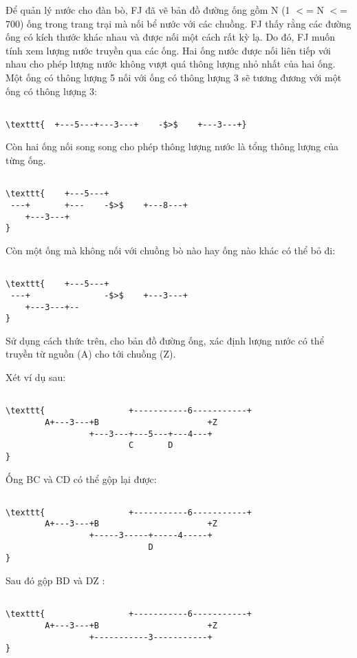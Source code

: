 

Để quản lý nước cho đàn bò, FJ đã vẽ bản đồ đường ống gồm N (1 $<$= N $<$= 700) ống trong trang trại mà nối bể nước với các chuồng. FJ thấy rằng các đường ống có kích thước khác nhau và được nối một cách rất kỳ lạ. Do đó, FJ muốn tính xem lượng nước truyền qua các ống. Hai ống nước được nối liên tiếp với nhau cho phép lượng nước không vượt quá thông lượng nhỏ nhất của hai ống. Một ống có thông lượng 5 nối với ống có thông lượng 3 sẽ tương đương với một ống có thông lượng 3:
\begin{verbatim}

\texttt{  +---5---+---3---+    -$>$    +---3---+}\end{verbatim}

Còn hai ống nối song song cho phép thông lượng nước là tổng thông lượng của từng ống.
\begin{verbatim}

\texttt{    +---5---+
 ---+       +---    -$>$    +---8---+
    +---3---+
}\end{verbatim}

Còn một ống mà không nối với chuồng bò nào hay ống nào khác có thể bỏ đi:
\begin{verbatim}

\texttt{    +---5---+
 ---+               -$>$    +---3---+
    +---3---+--
}\end{verbatim}

Sử dụng cách thức trên, cho bản đồ đường ống, xác định lượng nước có thể truyền từ nguồn (A) cho tới chuồng (Z).

Xét ví dụ sau:
\begin{verbatim}

\texttt{                 +-----------6-----------+
        A+---3---+B                      +Z
                 +---3---+---5---+---4---+
                         C       D
}\end{verbatim}

Ống BC và CD có thể gộp lại được:
\begin{verbatim}

\texttt{                 +-----------6-----------+
        A+---3---+B                      +Z
                 +-----3-----+-----4-----+
                             D
}\end{verbatim}

Sau đó gộp BD và DZ :
\begin{verbatim}

\texttt{                 +-----------6-----------+
        A+---3---+B                      +Z
                 +-----------3-----------+
}\end{verbatim}

